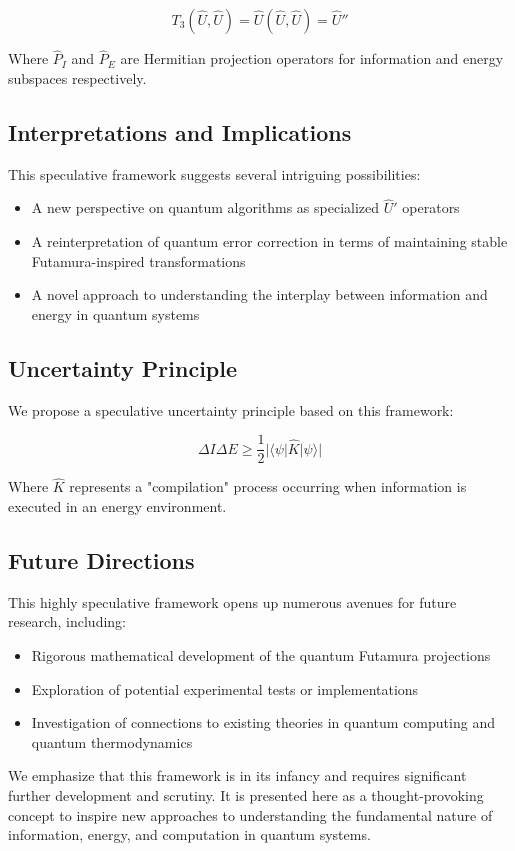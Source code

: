 \begin{equation}
    T_3(\hat{U}, \hat{U}) = \hat{U}(\hat{U}, \hat{U}) = \hat{U}''
\end{equation}

Where $\hat{P}_I$ and $\hat{P}_E$ are Hermitian projection operators for information and energy subspaces respectively.

\subsection{Interpretations and Implications}

This speculative framework suggests several intriguing possibilities:

\begin{itemize}
    \item A new perspective on quantum algorithms as specialized $\hat{U}'$ operators
    \item A reinterpretation of quantum error correction in terms of maintaining stable Futamura-inspired transformations
    \item A novel approach to understanding the interplay between information and energy in quantum systems
\end{itemize}

\subsection{Uncertainty Principle}

We propose a speculative uncertainty principle based on this framework:

\begin{equation}
    \Delta I \Delta E \geq \frac{1}{2}|\langle\psi|\hat{K}|\psi\rangle|
\end{equation}

Where $\hat{K}$ represents a "compilation" process occurring when information is executed in an energy environment.

\subsection{Future Directions}

This highly speculative framework opens up numerous avenues for future research, including:

\begin{itemize}
    \item Rigorous mathematical development of the quantum Futamura projections
    \item Exploration of potential experimental tests or implementations
    \item Investigation of connections to existing theories in quantum computing and quantum thermodynamics
\end{itemize}

We emphasize that this framework is in its infancy and requires significant further development and scrutiny. It is presented here as a thought-provoking concept to inspire new approaches to understanding the fundamental nature of information, energy, and computation in quantum systems.